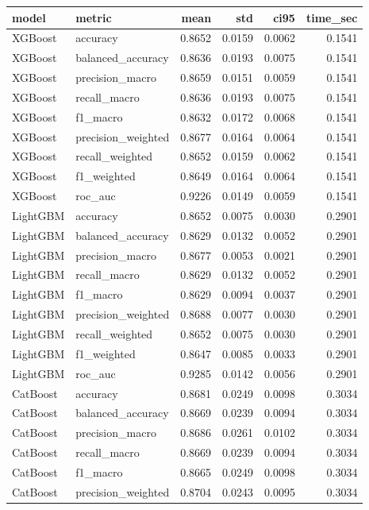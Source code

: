 \begin{tabular}{llrrrr}
\toprule
model & metric & mean & std & ci95 & time_sec \\
\midrule
XGBoost & accuracy & 0.8652 & 0.0159 & 0.0062 & 0.1541 \\
XGBoost & balanced_accuracy & 0.8636 & 0.0193 & 0.0075 & 0.1541 \\
XGBoost & precision_macro & 0.8659 & 0.0151 & 0.0059 & 0.1541 \\
XGBoost & recall_macro & 0.8636 & 0.0193 & 0.0075 & 0.1541 \\
XGBoost & f1_macro & 0.8632 & 0.0172 & 0.0068 & 0.1541 \\
XGBoost & precision_weighted & 0.8677 & 0.0164 & 0.0064 & 0.1541 \\
XGBoost & recall_weighted & 0.8652 & 0.0159 & 0.0062 & 0.1541 \\
XGBoost & f1_weighted & 0.8649 & 0.0164 & 0.0064 & 0.1541 \\
XGBoost & roc_auc & 0.9226 & 0.0149 & 0.0059 & 0.1541 \\
LightGBM & accuracy & 0.8652 & 0.0075 & 0.0030 & 0.2901 \\
LightGBM & balanced_accuracy & 0.8629 & 0.0132 & 0.0052 & 0.2901 \\
LightGBM & precision_macro & 0.8677 & 0.0053 & 0.0021 & 0.2901 \\
LightGBM & recall_macro & 0.8629 & 0.0132 & 0.0052 & 0.2901 \\
LightGBM & f1_macro & 0.8629 & 0.0094 & 0.0037 & 0.2901 \\
LightGBM & precision_weighted & 0.8688 & 0.0077 & 0.0030 & 0.2901 \\
LightGBM & recall_weighted & 0.8652 & 0.0075 & 0.0030 & 0.2901 \\
LightGBM & f1_weighted & 0.8647 & 0.0085 & 0.0033 & 0.2901 \\
LightGBM & roc_auc & 0.9285 & 0.0142 & 0.0056 & 0.2901 \\
CatBoost & accuracy & 0.8681 & 0.0249 & 0.0098 & 0.3034 \\
CatBoost & balanced_accuracy & 0.8669 & 0.0239 & 0.0094 & 0.3034 \\
CatBoost & precision_macro & 0.8686 & 0.0261 & 0.0102 & 0.3034 \\
CatBoost & recall_macro & 0.8669 & 0.0239 & 0.0094 & 0.3034 \\
CatBoost & f1_macro & 0.8665 & 0.0249 & 0.0098 & 0.3034 \\
CatBoost & precision_weighted & 0.8704 & 0.0243 & 0.0095 & 0.3034 \\

\end{tabular}
